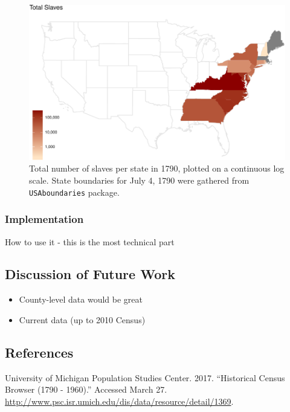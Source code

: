 \documentclass[11pt,]{article}
\providecommand{\tightlist}{%
  \setlength{\itemsep}{0pt}\setlength{\parskip}{0pt}}
\begin{document}
\begin{figure}[htbp]
\centering
\includegraphics{writeup_files/figure-latex/chunk-1790-map-1.pdf}
\caption{Total number of slaves per state in 1790, plotted on a
continuous log scale. State boundaries for July 4, 1790 were gathered
from \texttt{USAboundaries} package.}
\end{figure}

\subsubsection{Implementation}\label{implementation}

How to use it - this is the most technical part

\subsection{Discussion of Future Work}\label{discussion-of-future-work}

\begin{itemize}
\tightlist
\item
  County-level data would be great\\
\item
  Current data (up to 2010 Census)
\end{itemize}

\subsection*{References}\label{references}

\hypertarget{refs}{}
\hypertarget{ref-UMich-HCB}{}
University of Michigan Population Studies Center. 2017. ``Historical
Census Browser (1790 - 1960).'' Accessed March 27.
\url{http://www.psc.isr.umich.edu/dis/data/resource/detail/1369}.
\end{document}

